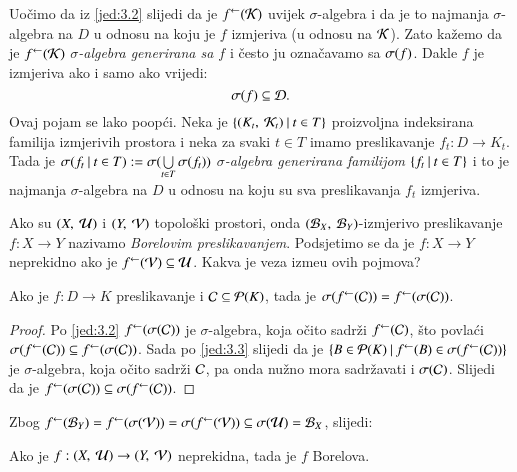 Uo\v cimo da iz \eqref{jed:3.2} slijedi da je ${f}^{\leftarrow}(\mathcal{K})$ uvijek $\sigma$-algebra i da je to najmanja $\sigma$-algebra na $D$ u odnosu na koju je $f$ izmjeriva (u odnosu na $\mathcal{K}$).
Zato ka\v zemo da je ${f}^{\leftarrow}(\mathcal{K})$ \emph{$\sigma$-algebra generirana sa $f$} i \v cesto ju ozna\v cavamo sa \emph{$\sigma({f})$}.
Dakle $f$ je izmjeriva ako i samo ako vrijedi:
\begin{equation*}
    \sigma({f}) \subseteq \mathcal{D}.
\end{equation*}
Ovaj pojam se lako poop\' ci.
Neka je $\{{(K_t, \: \mathcal{K}_t)} \: | \: {t \in T}\}$ proizvoljna indeksirana familija izmjerivih prostora i neka za svaki $t \in T$ imamo preslikavanje $f_t : D \to K_t$.
Tada je  $\sigma({f_t} \: | \: {t \in T}) := \sigma({\bigcup\limits_{t \in T}^{} \sigma({f_t})})$ \emph{$\sigma$-algebra generirana familijom $\{{f_t} \: | \: {t \in T}\}$} i to je najmanja $\sigma$-algebra na $D$ u odnosu na koju su sva preslikavanja $f_t$ izmjeriva.

Ako su $(X, \: \mathcal{U})$ i $(Y, \: \mathcal{V})$ topolo\v ski prostori, onda $(\mathcal{B}_{X}, \: \mathcal{B}_{Y})$-izmjerivo preslikavanje $f: X \to Y$ nazivamo \emph{Borelovim preslikavanjem}.
Podsjetimo se da je $f: X \to Y$ neprekidno ako je ${f}^{\leftarrow}(\mathcal{V}) \subseteq \mathcal{U}$.
Kakva je veza izme\dj u ovih pojmova?

\begin{lm}  \label{lm:3.4}
    Ako je $f: D \to K$ preslikavanje i $\mathcal{C} \subseteq \mathcal{P}({K})$, tada je $\sigma({{f}^{\leftarrow}(\mathcal{C})}) = {f}^{\leftarrow} (\sigma({\mathcal{C}}))$.
\end{lm}

\begin{proof}
    Po \eqref{jed:3.2} ${f}^{\leftarrow}(\sigma({\mathcal{C}}))$ je $\sigma$-algebra, koja o\v cito sadr\v zi ${f}^{\leftarrow}(\mathcal{C})$, \v sto povla\' ci $\sigma({{f}^{\leftarrow}(\mathcal{C})}) \subseteq {f}^{\leftarrow}(\sigma({\mathcal{C}}))$.
    Sada po \eqref{jed:3.3} slijedi da je $\{{B \in \mathcal{P}({K})} \: | \: {{f}^{\leftarrow}(B) \in \sigma({{f}^{\leftarrow}(\mathcal{C})})}\}$ je $\sigma$-algebra, koja o\v cito sadr\v zi $\mathcal{C}$, pa onda nu\v zno mora sadr\v zavati i $\sigma({\mathcal{C}})$.
    Slijedi da je ${f}^{\leftarrow}(\sigma({\mathcal{C}})) \subseteq \sigma({{f}^{\leftarrow}(\mathcal{C})})$.
\end{proof}

Zbog ${f}^{\leftarrow}(\mathcal{B}_{Y}) = {f}^{\leftarrow}(\sigma({\mathcal{V}})) = \sigma({{f}^{\leftarrow}(\mathcal{V})}) \subseteq \sigma({\mathcal{U}}) = \mathcal{B}_{X}$, slijedi:

\begin{kor} \label{kor:3.5}
    Ako je $f: (X, \: \mathcal{U}) \to (Y, \: \mathcal{V})$ neprekidna, tada je $f$ Borelova.
\end{kor}

